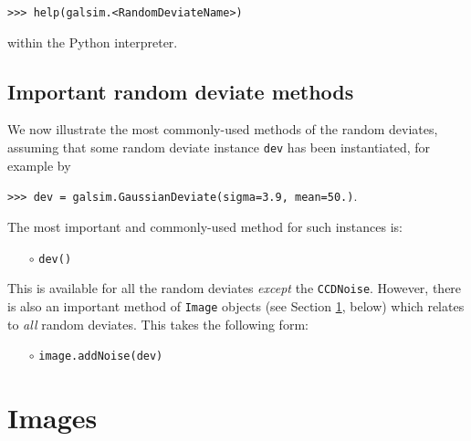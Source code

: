 \documentclass[preprint,11pt]{aastex}
\begin{document}
{\tt >>> help(galsim.<RandomDeviateName>)}

within the Python interpreter.

\subsection{Important random deviate methods}\label{sect:randommethods}
We now illustrate the most commonly-used methods of the random
deviates, assuming that some random deviate instance \texttt{dev} has
been instantiated, for example by

{\tt >>> dev = galsim.GaussianDeviate(sigma=3.9, mean=50.)}.

The most important and commonly-used method for such
instances is:
\begin{itemize}

\item[$\circ$] \texttt{dev()} 

\end{itemize}
This is available for all the random deviates \emph{except} the \texttt{CCDNoise}.
However, there is also an important method of \texttt{Image} objects
(see Section \ref{sect:image}, below) which relates to \emph{all} random
deviates.  This takes the following form:

\begin{itemize}

\item[$\circ$] \texttt{image.addNoise(dev)} 

\end{itemize}

\section{Images}\label{sect:image}
\end{document}
